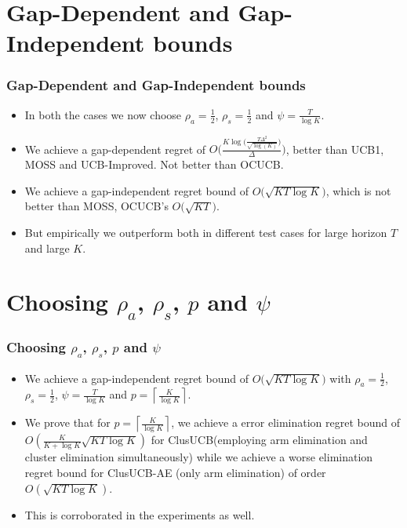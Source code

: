\documentclass{beamer}
\begin{document}
\section{Gap-Dependent and Gap-Independent bounds} 
\begin{frame}
\frametitle{Gap-Dependent and Gap-Independent bounds}

\begin{itemize}
\item In both the cases we now choose $\rho_a=\frac{1}{2}$, $\rho_s=\frac{1}{2}$ and $\psi=\frac{T}{\log K}$.
\item We achieve a gap-dependent regret of $O\bigg(\frac{K\log \big(\frac{T\Delta^{2}}{\sqrt{\log (K)}}\big)}{\Delta}\bigg)$, better than UCB1, MOSS and UCB-Improved. Not better than OCUCB.
\item We achieve a gap-independent regret bound of $O\bigg(\sqrt{KT\log K}\bigg)$, which is not better than MOSS, OCUCB's $O\bigg(\sqrt{KT}\bigg)$.
\item But empirically we outperform both in different test cases for large horizon $T$ and large $K$.
\end{itemize}
\end{frame}

\section{Choosing $\rho_a$, $\rho_s$, $p$ and $\psi$} 
\begin{frame}
\frametitle{Choosing $\rho_a$, $\rho_s$, $p$ and $\psi$}

\begin{itemize}
\item We achieve a gap-independent regret bound of $O\bigg(\sqrt{KT\log K}\bigg)$ with $\rho_a =\frac{1}{2}$, $\rho_s =\frac{1}{2}$, $\psi=\frac{T}{\log K}$ and $p=\left\lceil\frac{K}{\log K}\right\rceil$.
\item We prove that for $p=\left\lceil\frac{K}{\log K}\right\rceil$, we achieve a error elimination regret bound of $O(\frac{K}{K+\log K}\sqrt{KT\log K})$ for ClusUCB(employing arm elimination and cluster elimination simultaneously) while we achieve a worse elimination regret bound for ClusUCB-AE (only arm elimination) of order $O(\sqrt{KT\log K})$. 
\item This is corroborated in the experiments as well.
\end{itemize}
\end{frame}
\end{document}
